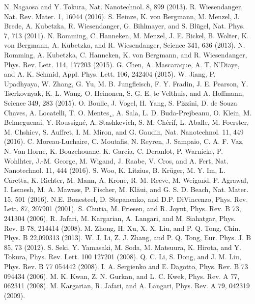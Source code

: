 \documentclass[aps,prb,twocolumn,showpacs,amssymb]{revtex4-1}
\begin{document}
\begin{thebibliography}{99}
 N. Nagaosa and Y. Tokura, Nat. Nanotechnol. 8, 899 (2013).
 R. Wiesendanger, Nat. Rev. Mater. 1, 16044 (2016).
 S. Heinze, K. von Bergmann, M. Menzel, J. Brede, A. Kubetzka, R. Wiesendanger, G. Bihlmayer, and S. Bl\"{u}gel, Nat. Phys. 7, 713 (2011).
 N. Romming, C. Hanneken, M. Menzel, J. E. Bickel, B. Wolter, K. von Bergmann, A. Kubetzka, and R. Wiesendanger, Science 341, 636 (2013).
 N. Romming, A. Kubetzka, C. Hanneken, K. von Bergmann, and R. Wiesendanger, Phys. Rev. Lett. 114, 177203 (2015).
 G. Chen, A. Mascaraque, A. T. N'Diaye, and A. K. Schmid, Appl. Phys. Lett. 106, 242404 (2015).
 W. Jiang, P. Upadhyaya, W. Zhang, G. Yu, M. B. Jungfleisch, F. Y. Fradin, J. E. Pearson, Y. Tserkovnyak, K. L. Wang, O. Heinonen, S. G. E. te Velthuis, and A. Hoffmann, Science 349, 283 (2015).
 O. Boulle, J. Vogel, H. Yang, S. Pizzini, D. de Souza Chaves, A. Locatelli, T. O. Mentes¸, A. Sala, L. D. Buda-Prejbeanu, O. Klein, M. Belmeguenai, Y. Roussign\'{e}, A. Stashkevich, S. M. Ch\'{e}rif, L. Aballe, M. Foerster, M. Chshiev, S. Auffret, I. M. Miron, and G. Gaudin, Nat. Nanotechnol. 11, 449 (2016).
 C. Moreau-Luchaire, C. Moutafis, N. Reyren, J. Sampaio, C. A. F. Vaz, N. Van Horne, K. Bouzehouane, K. Garcia, C. Deranlot, P. Warnicke, P. Wohlhter, J.-M. George, M. Wigand, J. Raabe, V. Cros, and A. Fert, Nat. Nanotechnol. 11, 444 (2016).
 S. Woo, K. Litzius, B. Kr\"{u}ger, M. Y. Im, L. Caretta, K. Richter, M. Mann, A. Krone, R. M. Reeve, M. Weigand, P. Agrawal, I. Lemesh, M. A. Mawass, P. Fischer, M. Kl\"{a}ui, and G. S. D. Beach, Nat. Mater. 15, 501 (2016).
 N.E. Bonesteel, D. Stepanenko, and D.P. DiVincenzo, Phys. Rev. Lett. 87, 207901 (2001).
 S. Chutia, M. Friesen, and R. Joynt, Phys. Rev. B 73, 241304 (2006).
 R. Jafari, M. Kargarian, A. Langari, and M. Siahatgar, Phys. Rev. B 78, 214414 (2008).
 M. Zhong, H. Xu, X. X. Liu, and P. Q. Tong, Chin. Phys. B  22,090313 (2013).
 W. J. Li, Z. J. Zhang, and P. Q. Tong, Eur. Phys. J. B 85, 73 (2012).
 S. Seki, Y. Yamasaki, M. Soda, M. Matsuura, K. Hirota, and Y. Tokura, Phys. Rev. Lett. 100 127201 (2008).
 Q. C. Li, S. Dong, and J. M. Liu, Phys. Rev. B 77 054442 (2008).
 I. A. Sergienko and E. Dagotto, Phys. Rev. B 73 094434 (2006).
 M. K. Kwan, Z. N. Gurkan, and L. C. Kwek, Phys. Rev. A 77, 062311 (2008).
 M. Kargarian, R. Jafari, and A. Langari, Phys. Rev. A 79, 042319 (2009).

\end{thebibliography}
\end{document}
